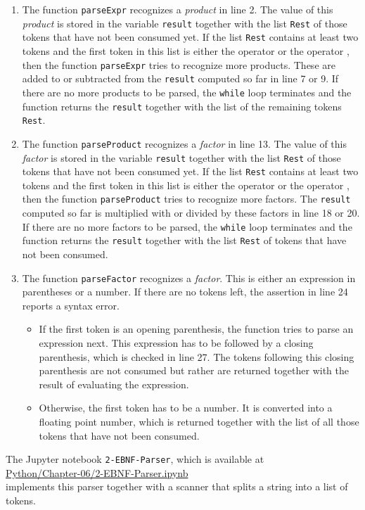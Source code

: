 \begin{enumerate}
\item The function \texttt{parseExpr} recognizes a \textsl{product} in line 2.
      The value of this \textsl{product} is stored in the variable
      \texttt{result} together with the list \texttt{Rest} of those tokens that have not been consumed
      yet.  If the list \texttt{Rest} contains at least two tokens and the first token in this
      list is either the operator \squoted{+} or the operator \squoted{-},
      then the function \texttt{parseExpr} tries to recognize more products.
      These are added to or subtracted from the \texttt{result} computed so far in
      line 7 or 9.  If there are no more products to be parsed, the \texttt{while} loop 
      terminates and the function returns the \texttt{result} together with the list of the remaining
      tokens \texttt{Rest}.
\item The function \texttt{parseProduct} recognizes a \textsl{factor} in line 13.
      The value of this \textsl{factor} is stored in the variable
      \texttt{result} together with the list \texttt{Rest} of those tokens that have not been consumed
      yet.  If the list \texttt{Rest} contains at least two tokens and the first token in this
      list is either the operator \squoted{*} or the operator \squoted{/},
      then the function \texttt{parseProduct} tries to recognize more factors.
      The \texttt{result} computed so far is multiplied with or divided by these factors in
      line 18 or 20.  If there are no more factors to be parsed, the \texttt{while} loop 
      terminates and the function returns the \texttt{result} together with the list
      \texttt{Rest} of tokens that have not been consumed.
\item The function \texttt{parseFactor} recognizes a \textsl{factor}.
      This is either an expression in parentheses or a number.  If there are no tokens left,
      the assertion in line 24 reports a syntax error.
      \begin{itemize}
      \item If the first token is an opening parenthesis, the function tries to parse
            an expression next.  This expression has to be followed by a closing parenthesis, which
            is checked in line 27.
            The tokens following this closing parenthesis are not consumed but rather are returned
            together with the result of evaluating the expression.
      \item Otherwise, the first token has to be a number.  It is converted into a floating point number,
            which is returned together with the list of all those tokens that have not been consumed.
      \end{itemize}
\end{enumerate}
The Jupyter notebook \texttt{2-EBNF-Parser}, which is available at
\\[0.2cm]
\hspace*{1.3cm}
\href{https://github.com/karlstroetmann/Formal-Languages/blob/master/Python/Chapter-06/2-EBNF-Parser.ipynb}{Python/Chapter-06/2-EBNF-Parser.ipynb}
\\[0.2cm]
implements this parser together with a scanner that splits a string into a list of tokens.

